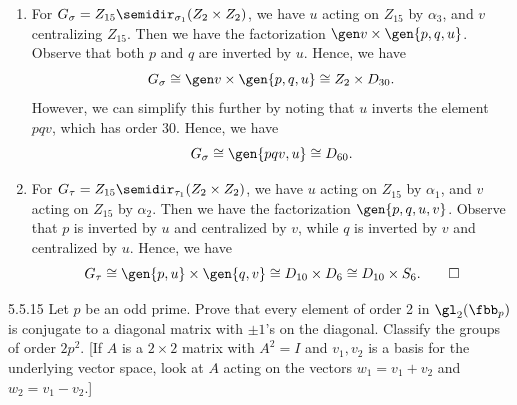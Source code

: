 \begin{solenum}
\begin{itemize}
\begin{enumerate}
	Observe that $p$ is centralized by $u$, and $q$ is inverted by $u$.
	Hence, we have
            \[
            	G_\rho \cong \gen v \times \gen p \times \gen{q, u} \cong Z_2 \times Z_5 \times D_6 \cong Z_{10} \times D_6.
            \]
            \item For $G_\sigma = Z_{15} \semidir_{\sigma_1} (Z_2 \times Z_2)$, we have $u$ acting on $Z_{15}$ by $\alpha_3$, and $v$ centralizing $Z_{15}$.
	Then we have the factorization $\gen v \times \gen{p, q, u}$.
	Observe that both $p$ and $q$ are inverted by $u$.
	Hence, we have
            \[
            	G_\sigma \cong \gen v \times \gen{p, q, u} \cong Z_2 \times D_{30}.
            \]
            However, we can simplify this further by noting that $u$ inverts the element $pqv$, which has order 30.
	Hence, we have
            \[
            	G_\sigma \cong \gen{pqv, u} \cong D_{60}.
            \]
            \item For $G_\tau = Z_{15} \semidir_{\tau_1} (Z_2 \times Z_2)$, we have $u$ acting on $Z_{15}$ by $\alpha_1$, and $v$ acting on $Z_{15}$ by $\alpha_2$.
	Then we have the factorization $\gen{p, q, u, v}$.
	Observe that $p$ is inverted by $u$ and centralized by $v$, while $q$ is inverted by $v$ and centralized by $u$.
	Hence, we have
            \[
            	G_\tau \cong \gen{p, u} \times \gen{q, v} \cong D_{10} \times D_6 \cong D_{10} \times S_6. \qedhere
            \]
        \end{enumerate}
    \end{itemize}
\end{solenum}

\begin{exercise}{5.5.15}
    Let $p$ be an odd prime.
	Prove that every element of order 2 in $\gl_2(\fbb_p)$ is conjugate to a diagonal matrix with $\pm 1$'s on the diagonal.
	Classify the groups of order $2p^2$. [If $A$ is a $2 \times 2$ matrix with $A^2 = I$ and $v_1, v_2$ is a basis for the underlying vector space, look at $A$ acting on the vectors $w_1 = v_1 + v_2$ and $w_2 = v_1 - v_2$.]
\end{exercise}

